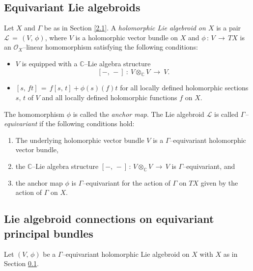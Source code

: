 \documentclass[12pt, reqno]{amsart}
\numberwithin{equation}{section}
\begin{document}
\subsection{Equivariant Lie algebroids}\label{2.2}

Let $X$ and $\Gamma$ be as in Section \ref{2.1}. A {\it holomorphic Lie algebroid on $X$} is a pair
$\mathcal{L}\,=\,(V,\,\phi)$, where $V$ is a holomorphic vector bundle on $X$ and $\phi\,:\,V
\,\longrightarrow \,TX$ is an ${\mathcal O}_X$--linear homomorphism satisfying the following conditions:
\begin{itemize}
\item $V$ is equipped with a $\mathbb{C}$--Lie algebra structure \[[-,\, -]\ :\ V\otimes_{\mathbb{C}}V\
\longrightarrow\ V.\]

\item $[s,\,ft]\,=\,f[s,\,t]+\phi(s)(f)t$ for all locally defined holomorphic sections $s,\,t$ of $V$ and
all locally defined holomorphic functions $f$ on $X$. 
\end{itemize}
The homomorphism $\phi$ is called the {\it anchor map}. The Lie
algebroid $\mathcal{L}$ is called {\it $\Gamma$--equivariant} if the following conditions hold:
\begin{enumerate}
\item The underlying holomorphic vector bundle $V$ is a $\Gamma$--equivariant holomorphic vector bundle,

\item the $\mathbb{C}$--Lie algebra structure $[-,\, -]\, :\, V\otimes_{\mathbb{C}}V\,
\longrightarrow\, V$ is $\Gamma$--equivariant, and

\item the anchor map $\phi$ is $\Gamma$--equivariant for the action of $\Gamma$ on $TX$ given by the
action of $\Gamma$ on $X$.
\end{enumerate}

\subsection{Lie algebroid connections on equivariant principal bundles}\label{2.3}

Let $(V,\,\phi)$ be a $\Gamma$--equivariant holomorphic Lie algebroid on $X$ with $X$ as in Section \ref{2.2}.
\end{document}
